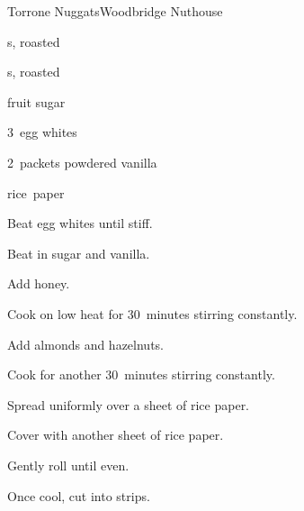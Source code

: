 \begin{recipe}{Torrone Nuggats}{Woodbridge Nuthouse}{}

\begin{ingredients}
\item {} 
\item {} s, roasted
\item {} s, roasted
\item {} fruit sugar
\item 3~egg whites
\item 2~packets powdered vanilla
\item rice~paper
\end{ingredients}

\begin{directions}
\item Beat egg whites until stiff.
\item Beat in sugar and vanilla.
\item Add honey.
\item Cook on low heat for 30~minutes stirring constantly.
\item Add almonds and hazelnuts.
\item Cook for another 30~minutes stirring constantly.
\item Spread uniformly over a sheet of rice paper.
\item Cover with another sheet of rice paper.
\item Gently roll until even.
\item Once cool, cut into strips.
\end{directions}

\end{recipe}
